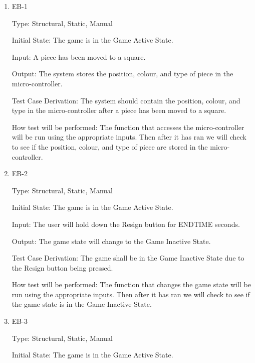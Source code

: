 \documentclass[12pt, titlepage]{article}
\begin{document}
  \begin{enumerate}

    \item{EB-1\\}

    Type: Structural, Static, Manual
                        
    Initial State: The game is in the Game Active State.
                        
    Input: A piece has been moved to a square.
                        
    Output: The system stores the position, colour, and type of piece in the micro-controller.
                        
    Test Case Derivation: The system should contain the position, colour, and type in the micro-controller
    after a piece has been moved to a square.

    How test will be performed: The function that accesses the micro-controller will be run using the appropriate inputs.
    Then after it has ran we will check to see if the position, colour, and type of piece are stored in the micro-controller.  

    \item{EB-2\\}

    Type: Structural, Static, Manual
                      
    Initial State: The game is in the Game Active State.
                        
    Input: The user will hold down the Resign button for ENDTIME seconds.
                        
    Output: The game state will change to the Game Inactive State.
                        
    Test Case Derivation: The game shall be in the Game Inactive State due to the Resign button being pressed.
    
    How test will be performed: The function that changes the game state will be run using the appropriate inputs.
    Then after it has ran we will check to see if the game state is in the Game Inactive State.

    \item{EB-3\\}

    Type: Structural, Static, Manual
                      
    Initial State: The game is in the Game Active State.
                        

\end{enumerate}
\end{document}
